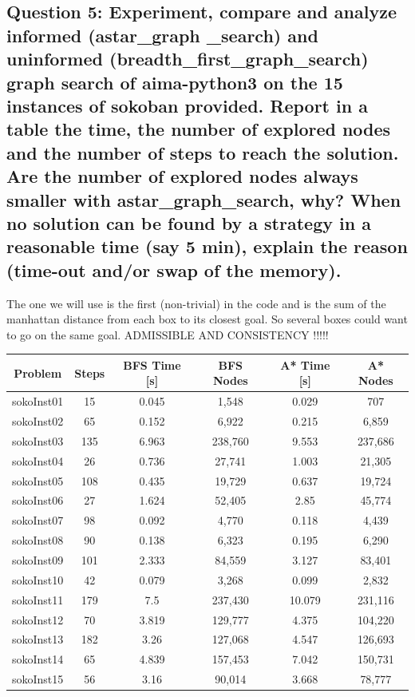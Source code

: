 \documentclass[a4paper,10pt]{article}
\begin{document}
		\subsection{Question 5: Experiment, compare and analyze informed (astar\_graph \_search) and uninformed (breadth\_first\_graph\_search) graph search of aima-python3 on the 15 instances of sokoban provided. Report in a table the time, the number of explored nodes and the number of steps to reach the solution. Are the number of explored nodes always smaller with astar\_graph\_search, why? When no solution can be found by a strategy in a reasonable time (say 5 min), explain the reason (time-out and/or swap of the memory).}
			The one we will use is the first (non-trivial) in the code and is the sum of the manhattan distance from each box to its closest goal. So several boxes could want to go on the same goal.
			ADMISSIBLE AND CONSISTENCY !!!!!\\
			
			\begin{tabular}{|c||c||c|c||c|c|}
				\hline 
				\textbf{Problem} & \textbf{Steps} & \textbf{BFS Time [s]} & \textbf{BFS Nodes} & \textbf{A* Time [s]} & \textbf{A* Nodes} \\ 
				\hline 
				sokoInst01 & 15 & 0.045 & 1,548 & 0.029 & 707 \\ 
				\hline
				sokoInst02 & 65 & 0.152 & 6,922 & 0.215 & 6,859 \\ 
				\hline
				sokoInst03 & 135 & 6.963 & 238,760 & 9.553 & 237,686 \\ 
				\hline
				sokoInst04 & 26 & 0.736 & 27,741 & 1.003 & 21,305 \\ 
				\hline
				sokoInst05 & 108 & 0.435 & 19,729 & 0.637 & 19,724 \\ 
				\hline
				sokoInst06 & 27 & 1.624 & 52,405 & 2.85 & 45,774 \\ 
				\hline
				sokoInst07 & 98 & 0.092 & 4,770 & 0.118 & 4,439 \\ 
				\hline
				sokoInst08 & 90 & 0.138 & 6,323 & 0.195 & 6,290 \\ 
				\hline
				sokoInst09 & 101 & 2.333 & 84,559 & 3.127 & 83,401 \\ 
				\hline
				sokoInst10 & 42 & 0.079 & 3,268 & 0.099 & 2,832 \\ 
				\hline
				sokoInst11 & 179 & 7.5 & 237,430 & 10.079 & 231,116 \\ 
				\hline
				sokoInst12 & 70 & 3.819 & 129,777 & 4.375 & 104,220 \\ 
				\hline
				sokoInst13 & 182 & 3.26 & 127,068 & 4.547 & 126,693 \\ 
				\hline
				sokoInst14 & 65 & 4.839 & 157,453 & 7.042 & 150,731 \\ 
				\hline
				sokoInst15 & 56 & 3.16 & 90,014 & 3.668 & 78,777 \\ 
				\hline
			\end{tabular}\\
			
\end{document}
